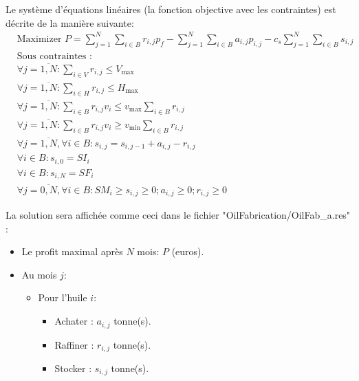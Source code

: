 \documentclass[10pt,a4paper]{article}
\begin{document}
Le système d'équations linéaires (la fonction objective avec les contraintes) est décrite de la manière suivante:
\begin{align*}
    & \text{Maximizer } P = \sum\limits_{j = 1}^N {\sum\limits_{i \in B}^{} {{r_{i,j}}p_f} }  - \sum\limits_{j = 1}^N {\sum\limits_{i \in B}^{} {{a_{i,j}}{p_{i,j}}} }  - {c_s}\sum\limits_{j = 1}^N {\sum\limits_{i \in B}^{} {{s_{i,j}}} }\\
    & \text{Sous contraintes : }\\
    & \forall j = \overline {1,N} :\sum\limits_{i \in V}^{} {{r_{i,j}}}  \le {V_{\max }}\\
    & \forall j = \overline {1,N} :\sum\limits_{i \in H}^{} {{r_{i,j}}}  \le {H_{\max }}\\
    & \forall j = \overline {1,N} :\sum\limits_{i \in B}^{} {{r_{i,j}}{v_i}}  \le {v_{\max }}\sum\limits_{i \in B}^{} {{r_{i,j}}} \\
    & \forall j = \overline {1,N} :\sum\limits_{i \in B}^{} {{r_{i,j}}{v_i}}  \ge {v_{\min }}\sum\limits_{i \in B}^{} {{r_{i,j}}} \\
    & \forall j = \overline {1,N} ,\forall i \in B:{s_{i,j}} = {s_{i,j - 1}} + {a_{i,j}} - {r_{i,j}}\\
    & \forall i \in B:{s_{i,0}} = S{I_i}\\
    & \forall i \in B:{s_{i,N}} = S{F_i}\\
    & \forall j = \overline {0,N} ,\forall i \in B:S{M_i} \ge {s_{i,j}} \ge 0;{a_{i,j}} \ge 0;{r_{i,j}} \ge 0
\end{align*}

La solution sera affichée comme ceci dans le fichier
"OilFabrication/OilFab\_{}a.res" :
\begin{itemize}
    \item Le profit maximal après $N$ mois: $P$ (euros).
    \item Au mois $j$:
    \begin{itemize}
        \item Pour l'huile $i$:
        \begin{itemize}
            \item Achater : $a_{i,j}$ tonne(s).
            \item Raffiner : $r_{i,j}$ tonne(s).
            \item Stocker : $s_{i,j}$ tonne(s).
        \end{itemize}
    \end{itemize}
\end{itemize}
\end{document}
